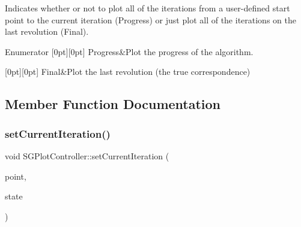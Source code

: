 Indicates whether or not to plot all of the iterations from a user-\/defined start point to the current iteration (Progress) or just plot all of the iterations on the last revolution (Final). \begin{DoxyEnumFields}{Enumerator}
[0pt][0pt]{}\mbox{\label{classSGPlotController_a7b1cebc57af82edfcbd1d2841ffad95cac93156b79a026d54b4b692977da89e87}} 
Progress&Plot the progress of the algorithm. \\
\hline

[0pt][0pt]{}\mbox{\label{classSGPlotController_a7b1cebc57af82edfcbd1d2841ffad95ca20f484d13a178c3ac5e886b798efa791}} 
Final&Plot the last revolution (the true correspondence) \\
\hline

\end{DoxyEnumFields}


\subsection{Member Function Documentation}
\mbox{\label{classSGPlotController_a3b0857d4b4c40bbac853ded334573fa0}} 
\subsubsection{\texorpdfstring{set\+Current\+Iteration()}{setCurrentIteration()}}
{\footnotesize\ttfamily void S\+G\+Plot\+Controller\+::set\+Current\+Iteration (\begin{DoxyParamCaption}\item[{\hyperlink{classSGPoint}{S\+G\+Point}}]{point,  }\item[{int}]{state }\end{DoxyParamCaption})}

